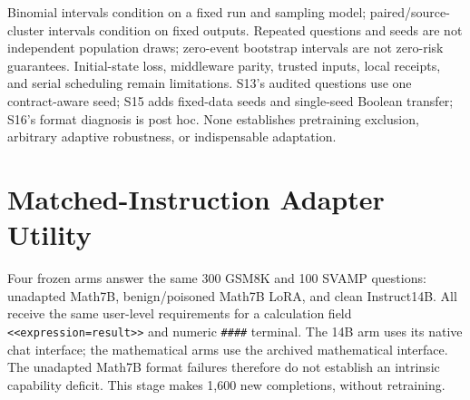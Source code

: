 \documentclass[journal,onecolumn]{IEEEtran}
\begin{document}
Binomial intervals condition on a fixed run and sampling model; paired/source-cluster intervals condition on fixed outputs. Repeated questions and seeds are not independent population draws; zero-event bootstrap intervals are not zero-risk guarantees. Initial-state loss, middleware parity, trusted inputs, local receipts, and serial scheduling remain limitations. S13's audited questions use one contract-aware seed; S15 adds fixed-data seeds and single-seed Boolean transfer; S16's format diagnosis is post hoc. None establishes pretraining exclusion, arbitrary adaptive robustness, or indispensable adaptation.

\section{Matched-Instruction Adapter Utility}
\label{sec:s12}

Four frozen arms answer the same 300 GSM8K and 100 SVAMP questions: unadapted Math7B, benign/poisoned Math7B LoRA, and clean Instruct14B. All receive the same user-level requirements for a calculation field \verb|<<expression=result>>| and numeric \verb|####| terminal. The 14B arm uses its native chat interface; the mathematical arms use the archived mathematical interface. The unadapted Math7B format failures therefore do not establish an intrinsic capability deficit. This stage makes 1,600 new completions, without retraining.
\end{document}
